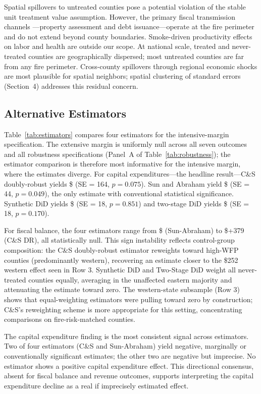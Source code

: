 \documentclass[12pt]{article}
\begin{document}
Spatial spillovers to untreated counties pose a potential violation of the stable
unit treatment value assumption. However, the primary fiscal transmission channels
---property assessment and debt issuance---operate at the fire perimeter and do not
extend beyond county boundaries. Smoke-driven productivity effects on labor and
health are outside our scope. At national scale, treated and never-treated counties
are geographically dispersed; most untreated counties are far from any fire perimeter.
Cross-county spillovers through regional economic shocks are most plausible for
spatial neighbors; spatial clustering of standard errors (Section~4) addresses this
residual concern.

\subsection{Alternative Estimators}
\label{sec:robustness}

Table~\ref{tab:estimators} compares four estimators for the intensive-margin
specification. The extensive margin is uniformly null across all seven outcomes
and all robustness specifications (Panel~A of Table~\ref{tab:robustness}); the
estimator comparison is therefore most informative for the intensive margin, where
the estimates diverge. For capital expenditures---the headline result---C\&S doubly-robust
yields \$ (SE = 164, $p = 0.075$). Sun and Abraham \citeyearpar{sun2021}
yield \$ (SE = 44, $p = 0.049$), the only estimate with conventional
statistical significance. Synthetic DiD \citep{arkhangelsky2021} yields \$
(SE = 18, $p = 0.851$) and two-stage DiD \citep{gardner2022} yields \$
(SE = 18, $p = 0.170$).

For fiscal balance, the four estimators range from \$ (Sun-Abraham) to
\$+379 (C\&S DR), all statistically null. This sign instability reflects
control-group composition: the C\&S doubly-robust estimator reweights toward
high-WFP counties (predominantly western), recovering an estimate closer to the
\$252 western effect seen in Row 3. Synthetic DiD and Two-Stage DiD weight
all never-treated counties equally, averaging in the unaffected eastern majority
and attenuating the estimate toward zero. The western-state subsample (Row 3) shows
that equal-weighting estimators were pulling toward zero by construction; C\&S's
reweighting scheme is more appropriate for this setting, concentrating comparisons
on fire-risk-matched counties.

The capital expenditure finding is the most consistent signal across estimators.
Two of four estimators (C\&S and Sun-Abraham) yield negative, marginally or
conventionally significant estimates; the other two are negative but imprecise.
No estimator shows a positive capital expenditure effect. This directional
consensus, absent for fiscal balance and revenue outcomes, supports interpreting
the capital expenditure decline as a real if imprecisely estimated effect.
\end{document}
